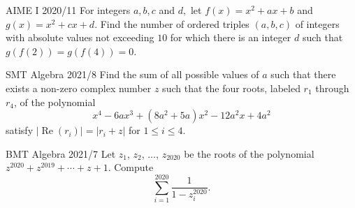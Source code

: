 \documentclass[11pt]{scrartcl}
\begin{document}
\begin{problem}[14]{AIME I 2020/11}
For integers $a,b,c$ and $d,$ let $f(x)=x^2+ax+b$ and $g(x)=x^2+cx+d$. Find the number of ordered triples $(a,b,c)$ of integers with absolute values not exceeding $10$ for which there is an integer $d$ such that $g(f(2))=g(f(4))=0$.
\end{problem}

\begin{problem}[15]{SMT Algebra 2021/8}
Find the sum of all possible values of $a$ such that there exists a non-zero complex number $z$ such that the four roots, labeled $r_1$ through $r_4$, of the polynomial \[x^4-6ax^3+(8a^2+5a)x^2-12a^2x+4a^2\] satisfy $|\operatorname{Re}(r_i)| = |r_i+z|$ for $1 \le i \le 4$.
\end{problem}

\begin{problem}[16]{BMT Algebra 2021/7}
Let $z_1$, $z_2$, $\dots$, $z_{2020}$ be the roots of the polynomial $z^{2020}+z^{2019}+\cdots+z+1$. Compute \[\sum_{i=1}^{2020}\dfrac{1}{1-z_i^{2020}}.\]
\end{problem}
\end{document}
